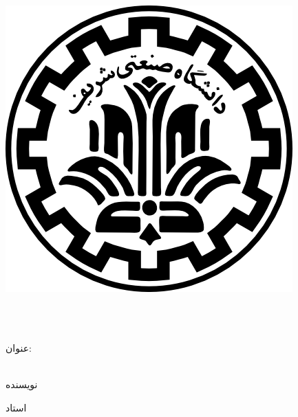 
\begin{center}

\includegraphics[scale=0.2]{images/logo.png}

\vspace{0.5cm}
\ThesisUniversity \\[-0.3em]
\vspace{0.5cm}
\ThesisDepartment\\

\begin{large}
\vspace{0.5cm}



\end{large}

\vspace{1.5cm}

{عنوان:}\\[1.2em]
{\LARGE\textbf{\ThesisTitle}}\\ 
\vspace{1cm}

\vspace{2cm}

{نویسنده}\\[.5em]
{\large\textbf{\ThesisAuthor}}

\vspace{1.5cm}

{استاد}\\[.5em]
{\large\textbf{\ThesisSupervisor}}

\vspace{1cm}



\vspace{2cm}

\ThesisDate

\end{center}

\newpage
